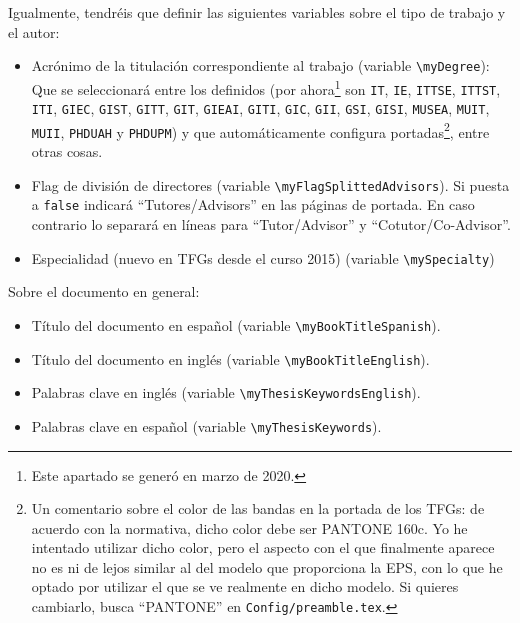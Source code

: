 \documentclass[spanish,openright]{book}
\begin{document}
Igualmente, tendréis que definir las siguientes variables sobre el tipo
de trabajo y el autor:

\begin{itemize} 
\item Acrónimo de la titulación correspondiente al trabajo (variable
  \texttt{\textbackslash{}myDegree}): Que se seleccionará entre los
  definidos (por ahora\footnote{Este apartado se generó en marzo de
    2020.} son \texttt{IT}, \texttt{IE}, \texttt{ITTSE}, \texttt{ITTST},
  \texttt{ITI}, \texttt{GIEC}, \texttt{GIST}, \texttt{GITT},
  \texttt{GIT}, \texttt{GIEAI}, \texttt{GITI}, \texttt{GIC},
  \texttt{GII}, \texttt{GSI}, \texttt{GISI}, \texttt{MUSEA},
  \texttt{MUIT}, \texttt{MUII}, \texttt{PHDUAH} y \texttt{PHDUPM}) y que
  automáticamente configura portadas\footnote{Un comentario sobre el
    color de las bandas en la portada de los TFGs: de acuerdo con la
    normativa, dicho color debe ser PANTONE 160c. Yo he intentado
    utilizar dicho color, pero el aspecto con el que finalmente aparece
    no es ni de lejos similar al del modelo que proporciona la EPS, con
    lo que he optado por utilizar el que se ve realmente en dicho
    modelo. Si quieres cambiarlo, busca ``PANTONE'' en
    \texttt{Config/preamble.tex}.}, entre otras cosas.

\item Flag de división de directores (variable
  \texttt{\textbackslash{}myFlagSplittedAdvisors}). Si puesta a
  \texttt{false} indicará ``Tutores/Advisors'' en las páginas de
  portada. En caso contrario lo separará en líneas para
  ``Tutor/Advisor'' y ``Cotutor/Co-Advisor''.

\item Especialidad (nuevo en TFGs desde el curso 2015) (variable
  \texttt{\textbackslash{}mySpecialty})

\end{itemize}

Sobre el documento en general:

\begin{itemize}
\item Título del documento en español (variable
  \texttt{\textbackslash{}myBookTitleSpanish}).
\item Título del documento en inglés (variable
  \texttt{\textbackslash{}myBookTitleEnglish}).
\item Palabras clave en inglés (variable \texttt{\textbackslash{}myThesisKeywordsEnglish}).
\item Palabras clave en español (variable \texttt{\textbackslash{}myThesisKeywords}).


\end{itemize}
\end{document}
